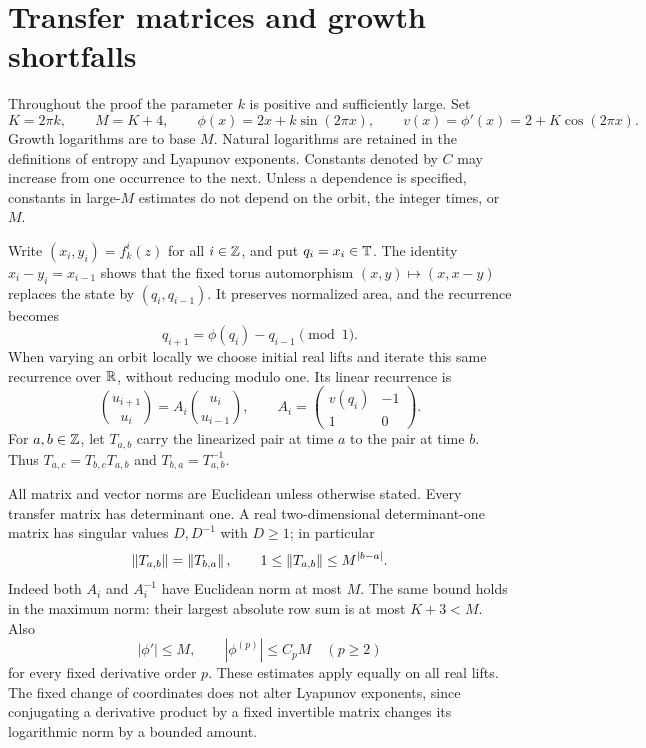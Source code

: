 \section{Transfer matrices and growth shortfalls}
\label{sec:setup}

Throughout the proof the parameter $k$ is positive and sufficiently large.
Set
\begin{equation}\label{setup:parameters}
 K=2\pi k,\qquad M=K+4,\qquad
 \phi(x)=2x+k\sin(2\pi x),\qquad
 v(x)=\phi'(x)=2+K\cos(2\pi x).
\end{equation}
Growth logarithms are to base $M$. Natural logarithms are retained in the
definitions of entropy and Lyapunov exponents. Constants denoted by $C$
may increase from one occurrence to the next. Unless a dependence is
specified, constants in large-$M$ estimates do not depend on the orbit,
the integer times, or $M$.

Write $(x_i,y_i)=f_k^i(z)$ for all $i\in\mathbb{Z}$, and put $q_i=x_i\in\mathbb{T}$.
The identity $x_i-y_i=x_{i-1}$ shows that the fixed torus automorphism
$(x,y)\mapsto(x,x-y)$ replaces the state by $(q_i,q_{i-1})$.
It preserves normalized area, and the recurrence becomes
\begin{equation}\label{setup:recurrence}
 q_{i+1}=\phi(q_i)-q_{i-1}\pmod1.
\end{equation}
When varying an orbit locally we choose initial real lifts and iterate
this same recurrence over $\mathbb{R}$, without reducing modulo one. Its linear
recurrence is
\begin{equation}\label{setup:transfer}
 \binom{u_{i+1}}{u_i}
 =A_i\binom{u_i}{u_{i-1}},\qquad
 A_i=\begin{pmatrix}v(q_i)&-1\\1&0\end{pmatrix}.
\end{equation}
For $a,b\in\mathbb{Z}$, let $T_{a,b}$ carry the linearized pair at time $a$ to
the pair at time $b$. Thus $T_{a,c}=T_{b,c}T_{a,b}$ and
$T_{b,a}=T_{a,b}^{-1}$.

All matrix and vector norms are Euclidean unless otherwise stated.
Every transfer matrix has determinant one. A real two-dimensional
determinant-one matrix has singular values $D,D^{-1}$ with $D\ge1$;
in particular
\begin{equation}\label{setup:norm-bounds}
 \left\lVert T_{a,b}\right\rVert=\left\lVert T_{b,a}\right\rVert,\qquad
 1\le\left\lVert T_{a,b}\right\rVert\le M^{|b-a|}.
\end{equation}
Indeed both $A_i$ and $A_i^{-1}$ have Euclidean norm at most $M$.
The same bound holds in the maximum norm: their largest absolute row sum
is at most $K+3<M$. Also
\begin{equation}\label{setup:derivatives}
 |\phi'|\le M,\qquad |\phi^{(p)}|\le C_pM\quad(p\ge2)
\end{equation}
for every fixed derivative order $p$. These estimates apply equally on
all real lifts. The fixed change of coordinates does not alter Lyapunov
exponents, since conjugating a derivative product by a fixed invertible
matrix changes its logarithmic norm by a bounded amount.


